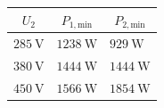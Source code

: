 \begin{solutiontable}[htb]
	\centering  %
	\begin{tabular}{lll}
		\toprule
		\multicolumn{1}{c}{$U_\mathrm{2}$}
		                  & \multicolumn{1}{c}{$P_\mathrm{1,min}$} & \multicolumn{1}{c}{$P_\mathrm{2,min}$} \\
		\midrule
		$\SI{285}{\volt}$ & $\SI{1238}{\watt} $                    & $\SI{929}{\watt} $                     \\
		$\SI{380}{\volt}$ & $\SI{1444}{\watt}$                     & $\SI{1444}{\watt}$                     \\
		$\SI{450}{\volt}$ & $\SI{1566}{\watt}$                     & $\SI{1854}{\watt}$                     \\
		\bottomrule
	\end{tabular}
	\caption{Minimal necessary power of SEPIC topology for BCM.}
	\label{table:PowerminSepic}
\end{solutiontable}%

